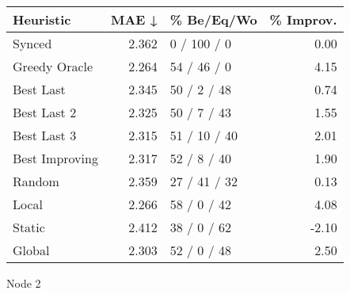 \begin{tabular}{lrlr}
\toprule
\textbf{Heuristic} & \textbf{MAE ↓} & \textbf{\% Be/Eq/Wo} & \textbf{\% Improv.} \\
\midrule
            Synced &          2.362 &          0 / 100 / 0 &                0.00 \\
     Greedy Oracle &          2.264 &          54 / 46 / 0 &                4.15 \\
         Best Last &          2.345 &          50 / 2 / 48 &                0.74 \\
       Best Last 2 &          2.325 &          50 / 7 / 43 &                1.55 \\
       Best Last 3 &          2.315 &         51 / 10 / 40 &                2.01 \\
    Best Improving &          2.317 &          52 / 8 / 40 &                1.90 \\
            Random &          2.359 &         27 / 41 / 32 &                0.13 \\
             Local &          2.266 &          58 / 0 / 42 &                4.08 \\
            Static &          2.412 &          38 / 0 / 62 &               -2.10 \\
            Global &          2.303 &          52 / 0 / 48 &                2.50 \\
\bottomrule
\end{tabular}
\caption{Node 2}
\label{tab:ds_non_lr05_le2_bs4_2}
